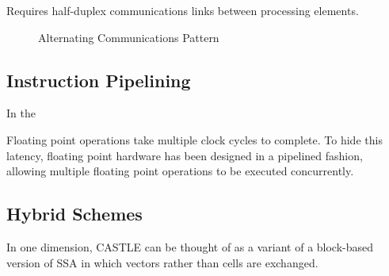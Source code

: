 Requires half-duplex communications links between processing elements.
\begin{figure}
  \centering
  
  \caption{Alternating Communications Pattern}
  \label{fig:alternatingcomms}
\end{figure}

\subsection{Instruction Pipelining}

In the 


Floating point operations take multiple clock cycles to complete.
To hide this latency, floating point hardware has been designed in a pipelined fashion, allowing multiple floating point operations to be executed concurrently.








\subsection{Hybrid Schemes}
In one dimension, CASTLE can be thought of as a variant of a block-based version of SSA in which vectors rather than cells are exchanged.
